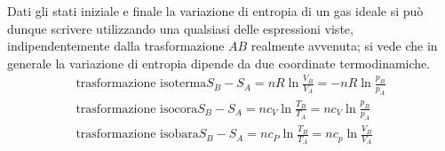 \documentclass[class=book, crop=false, oneside, 12pt]{standalone}
\begin{document}
Dati gli stati iniziale e finale la variazione di entropia di un gas ideale si può dunque scrivere utilizzando una qualsiasi delle espressioni viste, indipendentemente dalla trasformazione \(A B\) realmente avvenuta; si vede che in generale la variazione di entropia dipende da due coordinate termodinamiche.
\begin{align}
    \text{trasformazione isoterma} S_B - S_A = n R \ln \frac{V_B}{V_A} = - n R \ln \frac{p_B}{p_A} \\
    \text{trasformazione isocora} S_B - S_A = n c_V \ln \frac{T_B}{T_A} = n c_V \ln \frac{p_B}{p_A}\\
    \text{trasformazione isobara} S_B - S_A = n c_P \ln \frac{T_B}{T_A} = n c_p \ln \frac{V_B}{V_A}\\
\end{align}
\end{document}
